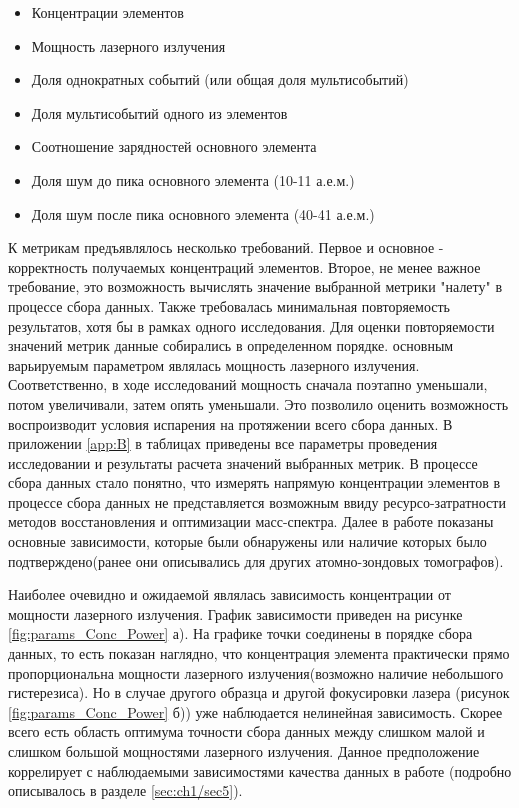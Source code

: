 \begin{itemize}
	\item Концентрации элементов
	\item Мощность лазерного излучения	
	\item Доля однократных событий (или общая доля мультисобытий)
	\item Доля мультисобытий одного из элементов
	\item Соотношение зарядностей основного элемента
	\item Доля шум до пика основного элемента (10-11 а.е.м.)
	\item Доля шум после пика основного элемента (40-41 а.е.м.)			
\end{itemize}

К метрикам предъявлялось несколько требований. Первое и основное - корректность получаемых концентраций элементов. Второе, не менее важное требование, это возможность вычислять значение выбранной метрики "налету" в процессе сбора данных. Также требовалась минимальная повторяемость результатов, хотя бы в рамках одного исследования. Для оценки повторяемости значений метрик данные собирались в определенном порядке. основным варьируемым параметром являлась мощность лазерного излучения. Соответственно, в ходе исследований мощность сначала поэтапно уменьшали, потом увеличивали, затем опять уменьшали. Это позволило оценить возможность воспроизводит условия испарения на протяжении всего сбора данных.  В приложении \cref{app:B} в таблицах приведены все параметры проведения исследовании и результаты расчета значений выбранных метрик. В процессе сбора данных стало понятно, что измерять напрямую концентрации элементов в процессе сбора данных не представляется возможным ввиду ресурсо-затратности методов восстановления и оптимизации масс-спектра.
Далее в работе показаны основные зависимости, которые были обнаружены или наличие которых было подтверждено(ранее они описывались для других атомно-зондовых томографов).

Наиболее очевидно и ожидаемой являлась зависимость концентрации от мощности лазерного излучения. График зависимости приведен на рисунке \cref{fig:params_Conc_Power} а). На графике точки соединены в порядке сбора данных, то есть показан наглядно, что концентрация элемента практически прямо пропорциональна мощности лазерного излучения(возможно наличие небольшого гистерезиса). Но в случае другого образца и другой фокусировки лазера (рисунок \cref{fig:params_Conc_Power} б)) уже наблюдается нелинейная зависимость. Скорее всего есть область оптимума точности сбора данных между слишком малой и слишком большой мощностями лазерного излучения. Данное предположение коррелирует с наблюдаемыми зависимостями качества данных в работе \cite{scbibOptParamsYAFI} (подробно описывалось в разделе \cref{sec:ch1/sec5}).

